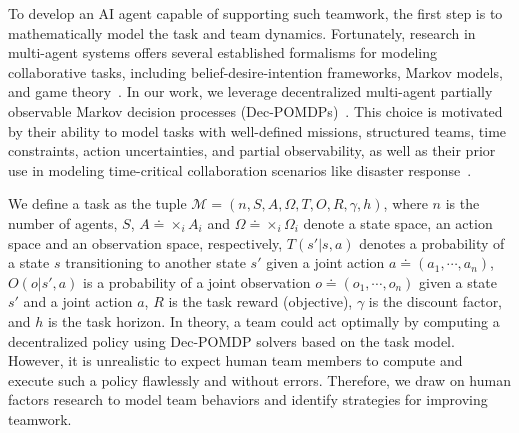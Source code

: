 To develop an AI agent capable of supporting such teamwork, the first step is to mathematically model the task and team dynamics. Fortunately, research in multi-agent systems offers several established formalisms for modeling collaborative tasks, including belief-desire-intention frameworks, Markov models, and game theory~\cite{tambe2005conflicts, bernstein2002complexity, nair2003taming, nair2005hybrid, chao2016timed, stone2010ad, grosz1999planning, grosz1996collaborative, modi2005adopt, harbers2012measuring, semsar2009multi, fridovich2020efficient, tian2022safety}. In our work, we leverage decentralized multi-agent partially observable Markov decision processes (Dec-POMDPs)~\cite{oliehoek2016concise}. This choice is motivated by their ability to model tasks with well-defined missions, structured teams, time constraints, action uncertainties, and partial observability, as well as their prior use in modeling time-critical collaboration scenarios like disaster response~\cite{chen2015decentralized, unhelkar2016contact, liu2017learning, lee2021multi,  dong2023optimizing}. 

We define a task as the tuple $\mathcal{M} = (n, S, A, \Omega, T, O, R, \gamma, h)$, where $n$ is the number of agents, $S$, $A\doteq\times_i A_i$ and $\Omega\doteq\times_i\Omega_i$ denote a state space, an action space and an observation space, respectively, $T(s'|s, a)$ denotes a probability of a state $s$ transitioning to another state $s'$ given a joint action $a\doteq(a_1, \cdots, a_n)$, $O(o|s', a)$ is a probability of a joint observation $o\doteq(o_1, \cdots, o_n)$ given a state $s'$ and a joint action $a$, $R$ is the task reward (objective), $\gamma$ is the discount factor, and $h$ is the task horizon. In theory, a team could act optimally by computing a decentralized policy using Dec-POMDP solvers based on the task model. However, it is unrealistic to expect human team members to compute and execute such a policy flawlessly and without errors. Therefore, we draw on human factors research to model team behaviors and identify strategies for improving teamwork.
